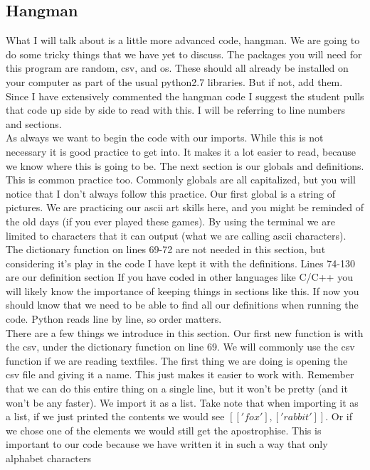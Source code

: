 \documentclass[11pt]{article}   %
\begin{document}
\subsection*{Hangman}
What I will talk about is a little more advanced code, hangman.  We are going to do some tricky things that 
we have yet to discuss.  The packages you will need for this program are random, csv, and os.  These should all
already be installed on your computer as part of the usual python2.7 libraries.  But if not, add them.  Since I 
have extensively commented the hangman code I suggest the student pulls that code up side by side to read with this.
I will be referring to line numbers and sections.
\\
As always we want to begin the code with our imports.  While this is not necessary it is good practice to get into.
It makes it a lot easier to read, because we know where this is going to be.  The next section is our globals and 
definitions.  This is common practice too.  Commonly globals are all capitalized, but you will notice that I 
don't always follow this practice.  Our first global is a string of pictures.  We are practicing our ascii art
skills here, and you might be reminded of the old days (if you ever played these games).  By using the terminal
we are limited to characters that it can output (what we are calling ascii characters). The dictionary function on 
lines 69-72 are not needed in this section, but considering it's play in the code I have kept it with the definitions.
Lines 74-130 are our definition section If you have coded in other languages like C/C++ you will likely know the 
importance of keeping things in sections like this.  If now you should know that we need to be able to find all
our definitions when running the code.  Python reads line by line, so order matters.
\\
There are a few things we introduce in this section.  Our first new function is with the csv, under the dictionary
function on line 69.  We will commonly use the csv function if we are reading textfiles.  The first thing we are doing is opening the csv file and giving it a name.  This just makes 
it easier to work with.  Remember that we can do this entire thing on a single line, but it won't be pretty (and 
it won't be any faster). We import it as a list.  Take note that when importing it as a list, if we just printed 
the contents we would see $[['fox'],['rabbit']]$.  Or if we chose one of the elements we would still get the 
apostrophise.  This is important to our code because we have written it in such a way that only alphabet characters
\end{document}
